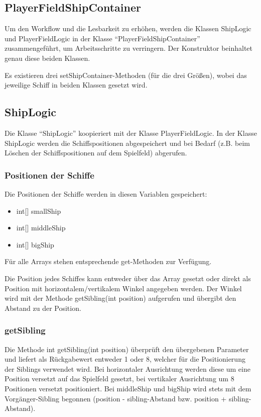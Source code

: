 \documentclass[11pt]{article} %
\begin{document}
\subsection{PlayerFieldShipContainer}
Um den Workflow und die Lesbarkeit zu erhöhen, werden die Klassen ShipLogic und PlayerFieldLogic in der Klasse \enquote{PlayerFieldShipContainer} zusammengeführt, um Arbeitsschritte zu verringern. Der Konstruktor beinhaltet genau diese beiden Klassen.

Es existieren drei setShipContainer-Methoden (für die drei Größen), wobei das jeweilige Schiff in beiden Klassen gesetzt wird.

\subsection{ShipLogic}
Die Klasse \enquote{ShipLogic} koopieriert mit der Klasse PlayerFieldLogic. In der Klasse ShipLogic werden die Schiffspositionen abgespeichert und bei Bedarf (z.B. beim Löschen der Schiffspositionen auf dem Spielfeld) abgerufen.

\subsubsection{Positionen der Schiffe}
Die Positionen der Schiffe werden in diesen Variablen gespeichert:
\begin{itemize}
\item int[] smallShip
\item int[] middleShip
\item int[] bigShip
\end{itemize}

Für alle Arrays stehen entsprechende get-Methoden zur Verfügung.

Die Position jedes Schiffes kann entweder über das Array gesetzt oder direkt als Position mit horizontalem/vertikalem Winkel angegeben werden. Der Winkel wird mit der Methode getSibling(int position) aufgerufen und übergibt den Abstand zu der Position.

\subsubsection{getSibling}
Die Methode int getSibling(int position) überprüft den übergebenen Parameter und liefert als Rückgabewert entweder 1 oder 8, welcher für die Positionierung der Siblings verwendet wird. Bei horizontaler Ausrichtung werden diese um eine Position versetzt auf das Spielfeld gesetzt, bei vertikaler Ausrichtung um 8 Positionen versetzt positioniert. Bei middleShip und bigShip wird stets mit dem Vorgänger-Sibling begonnen (position - sibling-Abstand bzw. position + sibling-Abstand).
\end{document}
